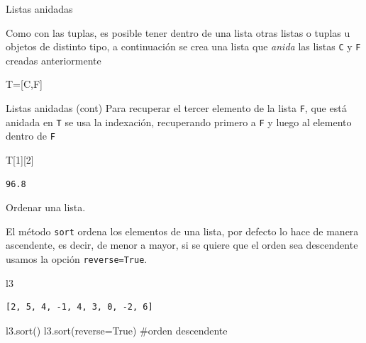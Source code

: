 \documentclass[
  ignorenonframetext,
  aspectratio=169,
  spanish,
]{beamer}
\newenvironment{Shaded}{\begin{snugshade}}{\end{snugshade}}
\newcommand{\CommentTok}[1]{\textcolor[rgb]{0.37,0.37,0.37}{#1}}
\newcommand{\DecValTok}[1]{\textcolor[rgb]{0.68,0.00,0.00}{#1}}
\newcommand{\NormalTok}[1]{\textcolor[rgb]{0.00,0.23,0.31}{#1}}
\newcommand{\OperatorTok}[1]{\textcolor[rgb]{0.37,0.37,0.37}{#1}}
\newcommand{\VariableTok}[1]{\textcolor[rgb]{0.07,0.07,0.07}{#1}}
\begin{document}
\begin{frame}[fragile]{Listas anidadas}
\label{listas-anidadas-1}

Como con las tuplas, es posible tener dentro de una lista otras listas o
tuplas u objetos de distinto tipo, a continuación se crea una lista que
\emph{anida} las listas \texttt{C} y \texttt{F} creadas anteriormente

\begin{Shaded}
\begin{Highlighting}[]
\NormalTok{T}\OperatorTok{=}\NormalTok{[C,F]}
\end{Highlighting}
\end{Shaded}
\end{frame}

\begin{frame}[fragile]{Listas anidadas (cont)}
\label{listas-anidadas-cont}
Para recuperar el tercer elemento de la lista \texttt{F}, que está
anidada en \texttt{T} se usa la indexación, recuperando primero a
\texttt{F} y luego al elemento dentro de \texttt{F}

\begin{Shaded}
\begin{Highlighting}[]
\NormalTok{T[}\DecValTok{1}\NormalTok{][}\DecValTok{2}\NormalTok{]}
\end{Highlighting}
\end{Shaded}

\begin{verbatim}
96.8
\end{verbatim}
\end{frame}

\begin{frame}[fragile]{Ordenar una lista.}
\label{ordenar-una-lista.}
 

El método \texttt{sort} ordena los elementos de una lista, por defecto
lo hace de manera ascendente, es decir, de menor a mayor, si se quiere
que el orden sea descendente usamos la opción \texttt{reverse=True}.

\begin{Shaded}
\begin{Highlighting}[]
\NormalTok{l3}
\end{Highlighting}
\end{Shaded}

\begin{verbatim}
[2, 5, 4, -1, 4, 3, 0, -2, 6]
\end{verbatim}

\begin{Shaded}
\begin{Highlighting}[]
\NormalTok{l3.sort()}
\NormalTok{l3.sort(reverse}\OperatorTok{=}\VariableTok{True}\NormalTok{) }\CommentTok{\#orden descendente }
\end{Highlighting}
\end{Shaded}
\end{frame}
\end{document}
